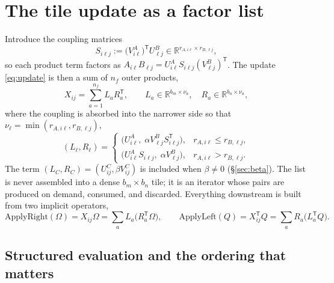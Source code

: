 \documentclass[11pt]{article}
\newcommand{\R}{\mathbb{R}}
\newcommand{\T}{\mathsf{T}}
\begin{document}
\section{The tile update as a factor list}
\label{sec:factorlist}

Introduce the coupling matrices
\begin{equation}
\label{eq:coupling}
S_{i\ell j}:=\bigl(V^A_{i\ell}\bigr)^{\T}U^B_{\ell j}
\in\R^{r_{A,i\ell}\times r_{B,\ell j}},
\end{equation}
so each product term factors as
$A_{i\ell}B_{\ell j}=U^A_{i\ell}S_{i\ell j}(V^B_{\ell j})^{\T}$. The update
\eqref{eq:update} is then a sum of $n_f$ outer products,
\begin{equation}
\label{eq:list}
X_{ij}=\sum_{a=1}^{n_f}L_aR_a^{\T},
\qquad
L_a\in\R^{b_m\times\nu_a},\quad R_a\in\R^{b_n\times\nu_a},
\end{equation}
where the coupling is absorbed into the narrower side so that
$\nu_\ell=\min(r_{A,i\ell},r_{B,\ell j})$,
\begin{equation}
\label{eq:absorb}
(L_\ell,R_\ell)=
\begin{cases}
\bigl(U^A_{i\ell},\;\alpha V^B_{\ell j}S_{i\ell j}^{\T}\bigr),
& r_{A,i\ell}\le r_{B,\ell j},\\[4pt]
\bigl(U^A_{i\ell}S_{i\ell j},\;\alpha V^B_{\ell j}\bigr),
& r_{A,i\ell}>r_{B,\ell j}.
\end{cases}
\end{equation}
The term $(L_C,R_C)=(U^C_{ij},\beta V^C_{ij})$ is included when $\beta\ne0$
(\S\ref{sec:beta}). The list is never assembled into a dense $b_m\times b_n$
tile; it is an iterator whose pairs are produced on demand, consumed, and
discarded. Everything downstream is built from two implicit operators,
\begin{equation}
\label{eq:apply}
\mathrm{ApplyRight}(\Omega)=X_{ij}\Omega=\sum_aL_a\bigl(R_a^{\T}\Omega\bigr),
\qquad
\mathrm{ApplyLeft}(Q)=X_{ij}^{\T}Q=\sum_aR_a\bigl(L_a^{\T}Q\bigr).
\end{equation}

\subsection{Structured evaluation and the ordering that matters}
\label{sec:ordering}
\end{document}
